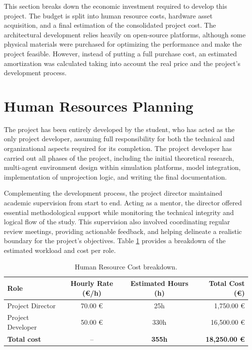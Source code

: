 This section breaks down the economic investment required to develop this project. The budget is split into human resource costs, hardware asset acquisition, and a final estimation of the consolidated project cost. The architectural development relies heavily on open-source platforms, although some physical materials were purchased for optimizing the performance and make the project feasible. However, instead of putting a full purchase cost, an estimated amortization was calculated taking into account the real price and the project's development process. 

\section{Human Resources Planning}
The project has been entirely developed by the student, who has acted as the only project developer, assuming full responsibility for both the technical and organizational aspects required for its completion. The project developer has carried out all phases of the project, including the initial theoretical research, multi-agent environment design within simulation platforms, model integration, implementation of unprojection logic, and writing the final documentation. 

Complementing the development process, the project director maintained academic supervision from start to end. Acting as a mentor, the director offered essential methodological support while monitoring the technical integrity and logical flow of the study. This supervision also involved coordinating regular review meetings, providing actionable feedback, and helping delineate a realistic boundary for the project's objectives. Table \ref{tab:budget_labor} provides a breakdown of the estimated workload and cost per role.

\begin{table}[H]
	\centering
	\small
	\begin{tabular}{l c c r}
		\toprule
		\textbf{Role} & \textbf{Hourly Rate (€/h)} & \textbf{Estimated Hours (h)} & \textbf{Total Cost (€)} \\
		\midrule
		Project Director  & 70.00 € & 25h  & 1,750.00 € \\
		Project Developer & 50.00 € & 330h & 16,500.00 € \\
		\midrule
		\textbf{Total cost} & -- & \textbf{355h} & \textbf{18,250.00 €} \\
		\bottomrule
	\end{tabular}
	\caption{Human Resource Cost breakdown.}
	\label{tab:budget_labor}
\end{table}

